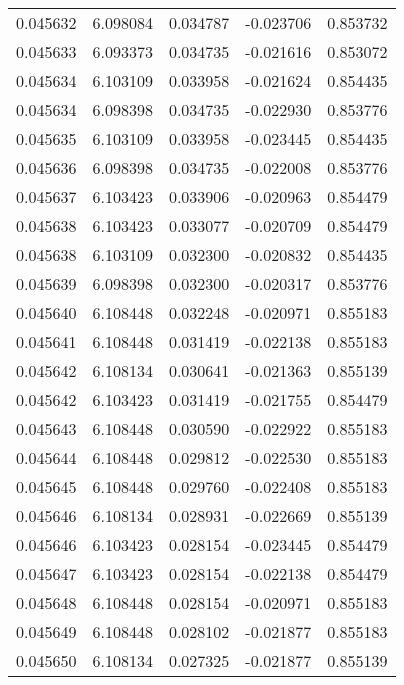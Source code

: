 \begin{tabular}{lrrrr}
0.045632    &  6.098084 &  0.034787 & -0.023706 &             0.853732 \\
0.045633    &  6.093373 &  0.034735 & -0.021616 &             0.853072 \\
0.045634    &  6.103109 &  0.033958 & -0.021624 &             0.854435 \\
0.045634    &  6.098398 &  0.034735 & -0.022930 &             0.853776 \\
0.045635    &  6.103109 &  0.033958 & -0.023445 &             0.854435 \\
0.045636    &  6.098398 &  0.034735 & -0.022008 &             0.853776 \\
0.045637    &  6.103423 &  0.033906 & -0.020963 &             0.854479 \\
0.045638    &  6.103423 &  0.033077 & -0.020709 &             0.854479 \\
0.045638    &  6.103109 &  0.032300 & -0.020832 &             0.854435 \\
0.045639    &  6.098398 &  0.032300 & -0.020317 &             0.853776 \\
0.045640    &  6.108448 &  0.032248 & -0.020971 &             0.855183 \\
0.045641    &  6.108448 &  0.031419 & -0.022138 &             0.855183 \\
0.045642    &  6.108134 &  0.030641 & -0.021363 &             0.855139 \\
0.045642    &  6.103423 &  0.031419 & -0.021755 &             0.854479 \\
0.045643    &  6.108448 &  0.030590 & -0.022922 &             0.855183 \\
0.045644    &  6.108448 &  0.029812 & -0.022530 &             0.855183 \\
0.045645    &  6.108448 &  0.029760 & -0.022408 &             0.855183 \\
0.045646    &  6.108134 &  0.028931 & -0.022669 &             0.855139 \\
0.045646    &  6.103423 &  0.028154 & -0.023445 &             0.854479 \\
0.045647    &  6.103423 &  0.028154 & -0.022138 &             0.854479 \\
0.045648    &  6.108448 &  0.028154 & -0.020971 &             0.855183 \\
0.045649    &  6.108448 &  0.028102 & -0.021877 &             0.855183 \\
0.045650    &  6.108134 &  0.027325 & -0.021877 &             0.855139 \\

\end{tabular}
